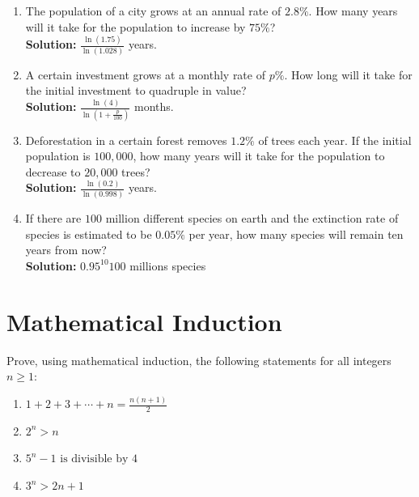 \documentclass{article}
\begin{document}
\begin{enumerate}[leftmargin = 0.5cm, label = \arabic*., rightmargin = 0.2cm]

    \item The population of a city grows at an annual rate of $2.8\%$. How many years will it take for the population to increase by $75\%$? \\
    \textbf{Solution:} $\frac{\ln(1.75)}{\ln\left(1.028\right)}$  years.

    \item A certain investment grows at a monthly rate of $p\%$. How long will it take for the initial investment to quadruple in value? \\
    \textbf{Solution:} $\frac{\ln(4)}{\ln\left(1 + \frac{p}{100}\right)}$ months.

    \item Deforestation in a certain forest removes $1.2\%$ of trees each year. If the initial population is $100,000$, how many years will it take for the population to decrease to $20,000$ trees? \\
    \textbf{Solution:} $\frac{\ln(0.2)}{\ln\left(0.998\right)}$ years.

    \item If there are $100$ million different species on earth and the extinction rate of species is estimated to be $0.05\%$ per year, how many species will remain ten years from now? \\
    \textbf{Solution:} $0.95^10 100$ millions species
    
\end{enumerate}

\section{Mathematical Induction}

Prove, using mathematical induction, the following statements for all integers \( n \geq 1 \):

\begin{enumerate}[leftmargin = 0.5cm, label = (\alph*), rightmargin = 0.2cm]

    \item $1 + 2 + 3 + \cdots + n = \frac{n(n+1)}{2}$

    \item $2^n > n$

    \item $5^n - 1 \text{ is divisible by } 4$

    \item $3^n > 2n + 1$

\end{enumerate}
\end{document}
